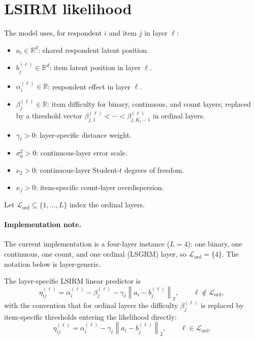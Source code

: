 \documentclass[11pt]{article}
\newcommand{\R}{\mathbb R}
\newcommand{\norm}[1]{\left\lVert #1 \right\rVert}
\begin{document}
\section{LSIRM likelihood}

The model uses, for respondent $i$ and item $j$ in layer $\ell$:
\begin{itemize}[leftmargin=1.5em]
    \item $a_i\in\R^d$: shared respondent latent position.
    \item $b_j^{(\ell)}\in\R^d$: item latent position in layer $\ell$.
    \item $\alpha_i^{(\ell)}\in\R$: respondent effect in layer $\ell$.
    \item $\beta_j^{(\ell)}\in\R$: item difficulty for binary, continuous,
    and count layers; replaced by a threshold vector
    $\beta_{j,1}^{(\ell)}<\cdots<\beta_{j,K_\ell-1}^{(\ell)}$ in ordinal
    layers.
    \item $\gamma_\ell>0$: layer-specific distance weight.
    \item $\sigma_0^2>0$: continuous-layer error scale.
    \item $\nu_2>0$: continuous-layer Student-$t$ degrees of freedom.
    \item $\kappa_j>0$: item-specific count-layer overdispersion.
\end{itemize}
Let $\mathcal L_{\mathrm{ord}}\subseteq\{1,\dots,L\}$ index the ordinal
layers.

\paragraph{Implementation note.}
The current implementation is a four-layer instance ($L=4$): one binary, one
continuous, one count, and one ordinal (LSGRM) layer, so
$\mathcal L_{\mathrm{ord}}=\{4\}$.  The notation below is layer-generic.

The layer-specific LSIRM linear predictor is
\begin{equation}
    \eta_{ij}^{(\ell)}
    =
    \alpha_i^{(\ell)}-\beta_j^{(\ell)}-\gamma_\ell\norm{a_i-b_j^{(\ell)}}_2,
    \qquad \ell\notin\mathcal L_{\mathrm{ord}},
    \label{eq:lsirm-linear-predictor}
\end{equation}
with the convention that for ordinal layers the difficulty $\beta_j^{(\ell)}$
is replaced by item-specific thresholds entering the likelihood directly:
\begin{equation}
    \eta_{ij}^{(\ell)}
    =
    \alpha_i^{(\ell)}-\gamma_\ell\norm{a_i-b_j^{(\ell)}}_2,
    \qquad \ell\in\mathcal L_{\mathrm{ord}}.
    \label{eq:lsirm-linear-predictor-ord}
\end{equation}
\end{document}
